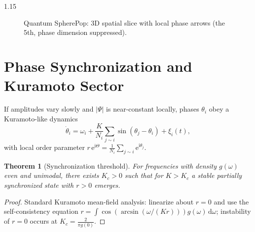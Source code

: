 \documentclass[12pt,a4paper]{article}
\numberwithin{equation}{section}
\theoremstyle{definition}
\theoremstyle{plain}
\newtheorem{theorem}{Theorem}[section]
\theoremstyle{remark}
\newcommand{\M}{\mathbb{M}}
\newcommand{\D}{\mathrm{d}}
\newcommand{\e}{\mathrm{e}}
\newcommand{\ii}{\mathrm{i}}
\begin{document}
\begin{spacing}{1.15}
\begin{figure}[H]
\centering
{}
\caption{Quantum SpherePop: 3D spatial slice with local phase arrows (the 5th, phase dimension suppressed).}
\label{fig:lattice-slice}
\end{figure}

\section{Phase Synchronization and Kuramoto Sector}\label{sec:kuramoto}
If amplitudes vary slowly and $|\Psi|$ is near-constant locally, phases $\theta_i$ obey a Kuramoto-like dynamics
\begin{equation}
\dot{\theta}_i = \omega_i + \frac{K}{N_i}\sum_{j\sim i}\sin(\theta_j-\theta_i) + \xi_i(t),
\end{equation}
with local order parameter $r\,\e^{\ii\Theta}=\frac{1}{N_i}\sum_{j\sim i}\e^{\ii \theta_j}$.

\begin{theorem}[Synchronization threshold]\label{thm:kuramoto}
For frequencies with density $g(\omega)$ even and unimodal, there exists $K_c>0$ such that for $K>K_c$ a stable partially synchronized state with $r>0$ emerges.
\end{theorem}
\begin{proof}
Standard Kuramoto mean-field analysis: linearize about $r=0$ and use the self-consistency equation $r=\int \cos(\arcsin(\omega/(Kr)))g(\omega)\,\D\omega$; instability of $r=0$ occurs at $K_c=\frac{2}{\pi g(0)}$.
\end{proof}


\end{spacing}
\end{document}
